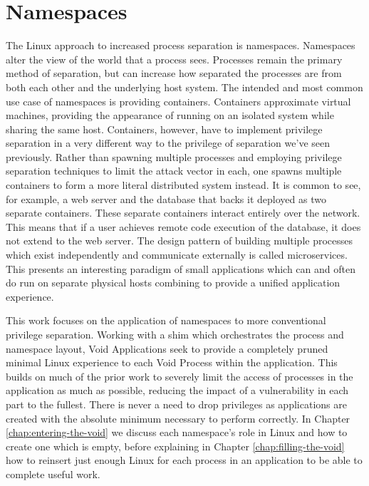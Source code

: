 \documentclass[a4paper,12pt,twoside,openright]{report}
\begin{document}
\section{Namespaces}

The Linux approach to increased process separation is namespaces. Namespaces alter the view of the world that a process sees. Processes remain the primary method of separation, but can increase how separated the processes are from both each other and the underlying host system. The intended and most common use case of namespaces is providing containers. Containers approximate virtual machines, providing the appearance of running on an isolated system while sharing the same host. Containers, however, have to implement privilege separation in a very different way to the privilege of separation we've seen previously. Rather than spawning multiple processes and employing privilege separation techniques to limit the attack vector in each, one spawns multiple containers to form a more literal distributed system instead. It is common to see, for example, a web server and the database that backs it deployed as two separate containers. These separate containers interact entirely over the network. This means that if a user achieves remote code execution of the database, it does not extend to the web server. The design pattern of building multiple processes which exist independently and communicate externally is called microservices. This presents an interesting paradigm of small applications which can and often do run on separate physical hosts combining to provide a unified application experience.

This work focuses on the application of namespaces to more conventional privilege separation. Working with a shim which orchestrates the process and namespace layout, Void Applications seek to provide a completely pruned minimal Linux experience to each Void Process within the application. This builds on much of the prior work to severely limit the access of processes in the application as much as possible, reducing the impact of a vulnerability in each part to the fullest. There is never a need to drop privileges as applications are created with the absolute minimum necessary to perform correctly. In Chapter \ref{chap:entering-the-void} we discuss each namespace's role in Linux and how to create one which is empty, before explaining in Chapter \ref{chap:filling-the-void} how to reinsert just enough Linux for each process in an application to be able to complete useful work.
\end{document}
